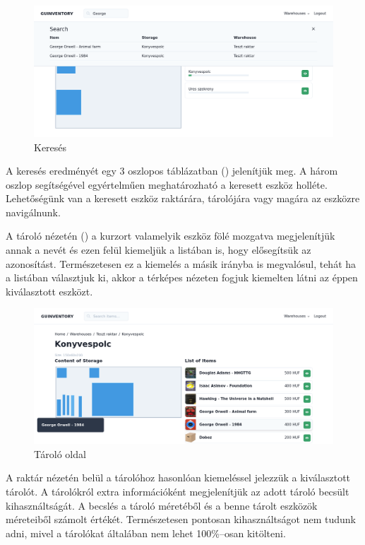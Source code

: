 \begin{figure}[!ht]
  \centering
  \includegraphics[width=150mm, keepaspectratio]{figures/search.png}
  \caption{Keresés}
  \label{fig:search}
\end{figure}

A keresés eredményét egy 3 oszlopos táblázatban () jelenítjük meg.
A három oszlop segítségével egyértelműen meghatározható a keresett eszköz holléte.
Lehetőségünk van a keresett eszköz raktárára, tárolójára vagy magára az eszközre navigálnunk.

A tároló nézetén () a kurzort valamelyik eszköz fölé mozgatva megjelenítjük annak a nevét és ezen felül kiemeljük a listában is, hogy elősegítsük az azonosítást.
Természetesen ez a kiemelés a másik irányba is megvalósul, tehát ha a listában választjuk ki, akkor a térképes nézeten fogjuk kiemelten látni az éppen kiválasztott eszközt.

\begin{figure}[!ht]
  \centering
  \includegraphics[width=150mm, keepaspectratio]{figures/storage.png}
  \caption{Tároló oldal}
  \label{fig:storage}
\end{figure}

A raktár nézetén belül a tárolóhoz hasonlóan kiemeléssel jelezzük a kiválasztott tárolót.
A tárolókról extra információként megjelenítjük az adott tároló becsült kihasználtságát.
A becslés a tároló méretéből és a benne tárolt eszközök méreteiből számolt értékét.
Természetesen pontosan kihasználtságot nem tudunk adni, mivel a tárolókat általában nem lehet 100\%–osan kitölteni.

